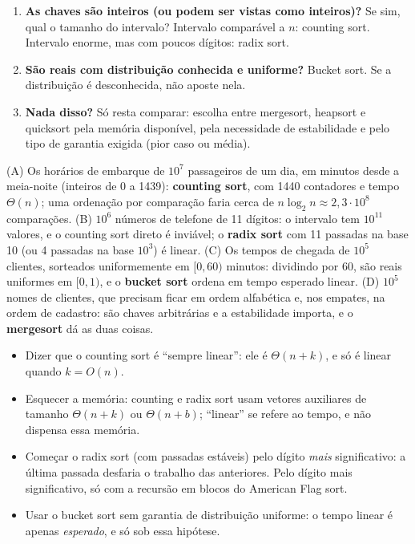 \begin{roteiro}
\begin{enumerate}
  \item \textbf{As chaves são inteiros (ou podem ser vistas como inteiros)?} Se sim, qual o tamanho do intervalo? Intervalo comparável a $n$: counting sort. Intervalo enorme, mas com poucos dígitos: radix sort.
  \item \textbf{São reais com distribuição conhecida e uniforme?} Bucket sort. Se a distribuição é desconhecida, não aposte nela.
  \item \textbf{Nada disso?} Só resta comparar: escolha entre mergesort, heapsort e quicksort pela memória disponível, pela necessidade de estabilidade e pelo tipo de garantia exigida (pior caso ou média).
\end{enumerate}
\end{roteiro}

\begin{exemplo}
(A) Os horários de embarque de $10^7$ passageiros de um dia, em minutos desde a meia-noite (inteiros de 0 a 1439): \textbf{counting sort}, com 1440 contadores e tempo $\Theta(n)$; uma ordenação por comparação faria cerca de $n\log_2n\approx2{,}3\cdot10^8$ comparações. (B) $10^6$ números de telefone de 11 dígitos: o intervalo tem $10^{11}$ valores, e o counting sort direto é inviável; o \textbf{radix sort} com 11 passadas na base 10 (ou 4 passadas na base $10^3$) é linear. (C) Os tempos de chegada de $10^5$ clientes, sorteados uniformemente em $[0,60)$ minutos: dividindo por 60, são reais uniformes em $[0,1)$, e o \textbf{bucket sort} ordena em tempo esperado linear. (D) $10^5$ nomes de clientes, que precisam ficar em ordem alfabética e, nos empates, na ordem de cadastro: são chaves arbitrárias e a estabilidade importa, e o \textbf{mergesort} dá as duas coisas.
\end{exemplo}

\begin{cuidado}
\begin{itemize}
  \item Dizer que o counting sort é ``sempre linear'': ele é $\Theta(n+k)$, e só é linear quando $k=O(n)$.
  \item Esquecer a memória: counting e radix sort usam vetores auxiliares de tamanho $\Theta(n+k)$ ou $\Theta(n+b)$; ``linear'' se refere ao tempo, e não dispensa essa memória.
  \item Começar o radix sort (com passadas estáveis) pelo dígito \emph{mais} significativo: a última passada desfaria o trabalho das anteriores. Pelo dígito mais significativo, só com a recursão em blocos do American Flag sort.
  \item Usar o bucket sort sem garantia de distribuição uniforme: o tempo linear é apenas \emph{esperado}, e só sob essa hipótese.
\end{itemize}
\end{cuidado}


